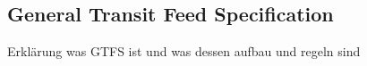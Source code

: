 \begin{flushleft}
	
\end{flushleft}\subsection{General Transit Feed Specification}
Erklärung was GTFS ist und was dessen aufbau und regeln sind